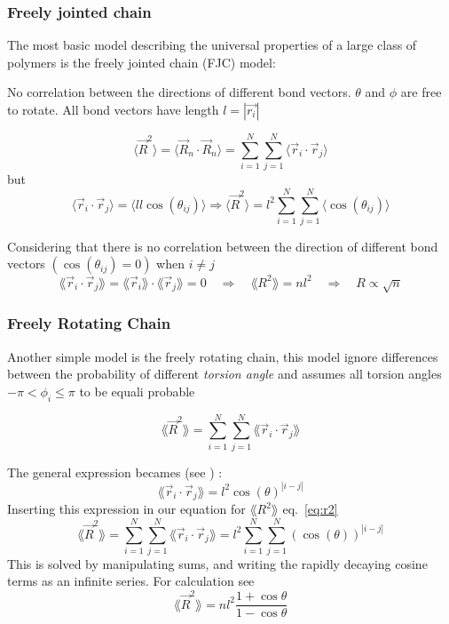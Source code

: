 \subsubsection{Freely jointed chain} 
The most basic model describing the universal properties of a large class of polymers
is the freely jointed chain (FJC) model: 

No correlation between the directions of different bond vectors. $\theta$ and $\phi$ are free to rotate. All bond vectors have length $l = |\vec{r_i}|$ 

\begin{equation}
\big \langle \vec{R}^2 \big \rangle = \big \langle \vec{R}_n \cdot \vec{R}_n \big \rangle = \sum_{i=1}^N \sum_{j=1}^N \big \langle \vec{r}_i \cdot \vec{r}_j \big \rangle 
\end{equation}
but 
\begin{equation}
 \big \langle \vec{r}_i \cdot \vec{r}_j \big \rangle = \big\langle l l \cos(\theta_{ij}) \big\rangle    \Rightarrow \big\langle \vec{R}^2 \big\rangle = l^2 \sum_{i=1}^N \sum_{j=1}^N \big \langle \cos(\theta_{ij}) \big\rangle \end{equation}

Considering that there is no correlation between the direction of different bond vectors $(\cos(\theta_{ij})=0)$ when $i \neq j$ 
\begin{equation}
\lang \vec{r}_i \cdot \vec{r}_j \rang = \lang \vec{r}_i \rang \cdot 
\lang \vec{r}_j \rang = 0 \quad \Rightarrow \quad \lang R^2 \rang = nl^2  \quad \Rightarrow \quad R \propto \sqrt{n}
 \end{equation}

\subsubsection{Freely Rotating Chain}
Another simple model is the freely rotating chain, this model ignore differences between the probability of different \textit{torsion angle} and assumes all torsion angles $-\pi < \phi_i \leq \pi $ to be equali probable~\cite{pp} 

\begin{equation} 
\lang \vec{R}^2 \rang=  \sum_{i=1}^N \sum_{j=1}^N \lang \vec{r}_i \cdot \vec{r}_j \rang 
\label{eq:r2}
\end{equation}

The general expression becames (see \cite{pp}) :
\begin{equation}
\lang \vec{r}_i \cdot \vec{r}_j \rang = l^2 \cos(\theta)^{|i-j|}
\end{equation}
Inserting this expression in our equation for $\lang R^2 \rang$ eq.~\ref{eq:r2} 
\begin{equation}
\lang \vec{R}^2 \rang=  \sum_{i=1}^N \sum_{j=1}^N \lang \vec{r}_i \cdot \vec{r}_j \rang = l^2  \sum_{i=1}^N \sum_{j=1}^N (\cos(\theta))^{|i-j|}
\end{equation}
This is solved by manipulating sums, and writing the rapidly decaying cosine terms as an infinite series. For calculation see~\cite{pp}
\begin{equation}
\lang \vec{R}^2 \rang = nl^2 \frac{1+\cos\theta}{1-\cos\theta} 
\end{equation}

